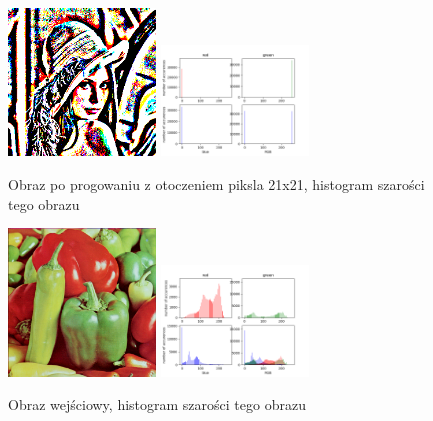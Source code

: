 \documentclass[final,a4paper,openany,12pt]{mwbk}
\begin{document}
\begin{figure}[H]
	\begin{center}
		\includegraphics[width=0.35\textwidth]{lena_color_localSingleThreshold_result}
		\includegraphics[width=0.35\textwidth]{lena_color_localSingleThreshold_histogram}
	\end{center}
	\caption{Obraz po progowaniu z otoczeniem piksla 21x21, histogram szarości tego obrazu}
\end{figure}

\begin{figure}[H]
	\begin{center}
		\includegraphics[width=0.35\textwidth]{peppers_color}
		\includegraphics[width=0.35\textwidth]{peppers_color_histogram}
	\end{center}
	\caption{Obraz wejściowy, histogram szarości tego obrazu}
\end{figure}
\end{document}
